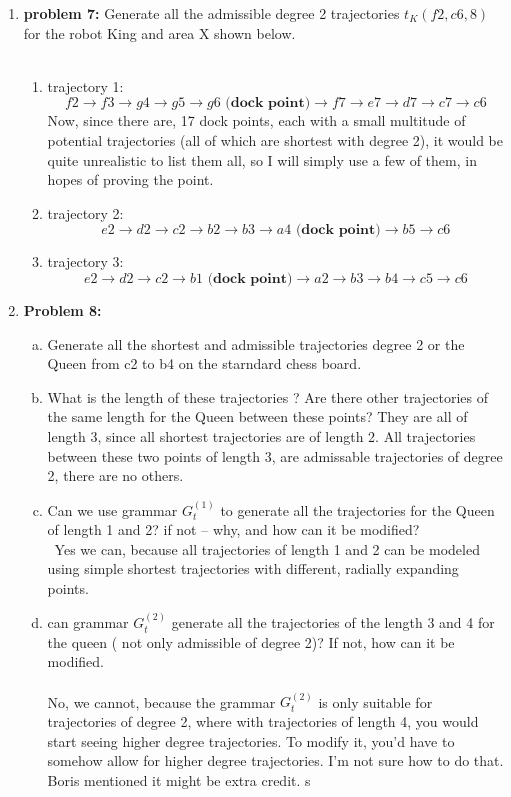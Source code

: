 \documentclass[11pt]{article}
\begin{document}
\begin{enumerate}
\item \textbf{problem 7:}
Generate all the admissible degree 2 trajectories $t_K(f2, c6, 8)$ for the robot King and area X shown below. \\\\
\begin{enumerate}
\item trajectory 1: 
$$f2 \rightarrow f3  \rightarrow  g4  \rightarrow g5  \rightarrow g6 \textbf{ (dock point)}  \rightarrow f7  \rightarrow e7  \rightarrow d7 \rightarrow c7  \rightarrow c6$$
Now, since there are, 17 dock points, each with a small multitude of potential trajectories (all of which are shortest with degree 2), it would be quite unrealistic to list them all, so I will simply use a few of them, in hopes of proving the point. 
\item trajectory 2: 
$$e2  \rightarrow d2  \rightarrow  c2  \rightarrow  b2 \rightarrow b3  \rightarrow  a4 \textbf{ (dock point)}  \rightarrow  b5  \rightarrow  c6$$
\item trajectory 3: 
$$e2  \rightarrow d2  \rightarrow  c2  \rightarrow  b1 \textbf{ (dock point)} \rightarrow a2  \rightarrow  b3  \rightarrow  b4  \rightarrow  c5 \rightarrow c6$$
\end{enumerate}
\item \textbf{Problem 8:}\\
\begin{enumerate}[(a)]
\item Generate all the shortest and admissible trajectories degree 2 or the Queen from c2 to b4 on the starndard chess board. 
\item What is the length of these trajectories ? Are there other trajectories of the same length for the Queen between these points? 
They are all of length 3, since all shortest trajectories are of length 2. All trajectories between these two points of length 3, are admissable trajectories of degree 2, there are no others. 
\item Can we use grammar $G_t^(1)$ to generate all the trajectories for the Queen of length 1 and 2? if not -- why, and how can it be modified? \\\
Yes we can, because all trajectories of length 1 and 2 can be modeled using simple shortest trajectories with different, radially expanding points. 
\item can grammar $G_t^(2)$ generate all the trajectories of the length 3 and 4 for the queen ( not only admissible of degree 2)? If not, how can it be modified. \\\\
No, we cannot, because the grammar $G_t^(2)$ is only suitable for trajectories of degree 2, where with trajectories of length 4, you would start seeing higher degree trajectories. To modify it, you'd have to somehow allow for higher degree trajectories. I'm not sure how to do that. Boris mentioned it might be extra credit. s
\end{enumerate}
\end{enumerate}
\end{document}

